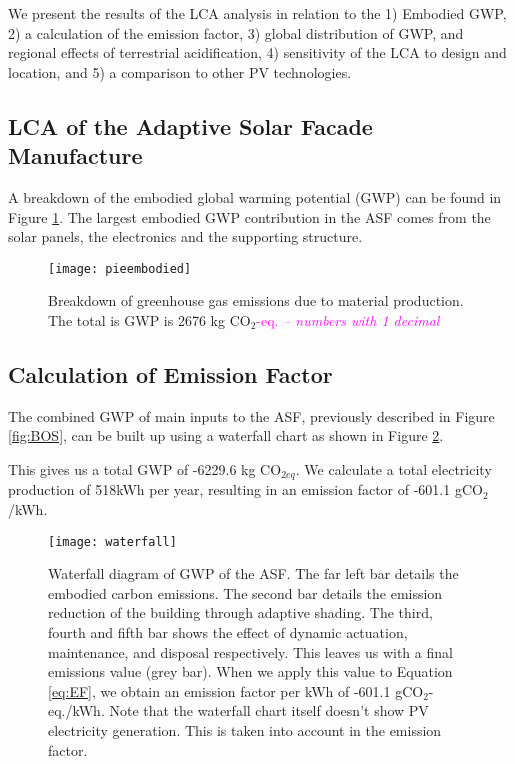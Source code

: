 
We present the results of the LCA analysis in relation to the 1) Embodied GWP, 2) a calculation of the emission factor, 3) global distribution of GWP, and regional effects of terrestrial acidification, 4) sensitivity of the LCA to design and location, and 5) a comparison to other PV technologies.

\subsection{LCA of the Adaptive Solar Facade Manufacture}

A breakdown of the embodied global warming potential (GWP) can be found in Figure  \ref{fig:embodied}. The largest embodied GWP contribution in the ASF comes from the solar panels, the electronics and the supporting structure.

\begin{figure}[H]
\begin{center}
\texttt{[image: pieembodied]}
\caption{Breakdown of greenhouse gas emissions due to material production. The total is GWP is 2676 kg CO$_{2}$\textcolor{magenta}{-eq.  \textit{-- numbers with 1 decimal }} }
\label{fig:embodied}
\end{center}
\end{figure}

\subsection{Calculation of Emission Factor}
The combined GWP of main inputs to the ASF, previously described in Figure \ref{fig:BOS}, can be built up using a waterfall chart as shown in Figure \ref{fig:waterfall}. 

This gives us a total GWP of -6229.6 kg CO$_{2eq}$. We calculate a total electricity production of 518kWh per year, resulting in an emission factor of -601.1 gCO${_2}$/kWh.

\begin{figure}[H]
\begin{center}
\texttt{[image: waterfall]}
\caption{Waterfall diagram of GWP of the ASF. The far left bar details the embodied carbon emissions. The second bar details the emission reduction of the building through adaptive shading. The third, fourth and fifth bar shows the effect of dynamic actuation, maintenance, and disposal respectively. This leaves us with a final emissions value (grey bar). When we apply this value to Equation \ref{eq:EF}, we obtain an emission factor per kWh of -601.1 gCO$_2$-eq./kWh. Note that the waterfall chart itself doesn't show PV electricity generation. This is taken into account in the emission factor.}

\label{fig:waterfall}
\end{center}
\end{figure}

